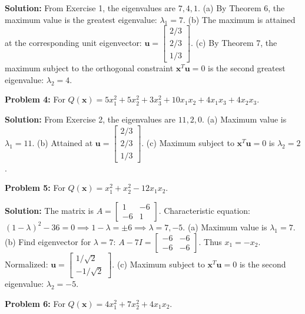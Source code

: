 \documentclass[11pt, letterpaper]{article}
\theoremstyle{definition}
\theoremstyle{remark}
\begin{document}
\textbf{Solution:}
From Exercise 1, the eigenvalues are $7, 4, 1$.
(a) By Theorem 6, the maximum value is the greatest eigenvalue: $\lambda_1 = 7$.
(b) The maximum is attained at the corresponding unit eigenvector: $\mathbf{u} = \begin{bmatrix} 2/3 \\ 2/3 \\ 1/3 \end{bmatrix}$.
(c) By Theorem 7, the maximum subject to the orthogonal constraint $\mathbf{x}^T\mathbf{u}=0$ is the second greatest eigenvalue: $\lambda_2 = 4$.

\vspace{1em}
\textbf{Problem 4:} For $Q(\mathbf{x}) = 5x_1^2 + 5x_2^2 + 3x_3^2 + 10x_1x_2 + 4x_1x_3 + 4x_2x_3$.

\textbf{Solution:}
From Exercise 2, the eigenvalues are $11, 2, 0$.
(a) Maximum value is $\lambda_1 = 11$.
(b) Attained at $\mathbf{u} = \begin{bmatrix} 2/3 \\ 2/3 \\ 1/3 \end{bmatrix}$.
(c) Maximum subject to $\mathbf{x}^T\mathbf{u}=0$ is $\lambda_2 = 2$.

\vspace{1em}
\textbf{Problem 5:} For $Q(\mathbf{x}) = x_1^2 + x_2^2 - 12x_1x_2$.

\textbf{Solution:}
The matrix is $A = \begin{bmatrix} 1 & -6 \\ -6 & 1 \end{bmatrix}$.
Characteristic equation: $(1-\lambda)^2 - 36 = 0 \implies 1-\lambda = \pm 6 \implies \lambda = 7, -5$.
(a) Maximum value is $\lambda_1 = 7$.
(b) Find eigenvector for $\lambda = 7$: $A - 7I = \begin{bmatrix} -6 & -6 \\ -6 & -6 \end{bmatrix}$. Thus $x_1 = -x_2$. Normalized: $\mathbf{u} = \begin{bmatrix} 1/\sqrt{2} \\ -1/\sqrt{2} \end{bmatrix}$.
(c) Maximum subject to $\mathbf{x}^T\mathbf{u}=0$ is the second eigenvalue: $\lambda_2 = -5$.

\vspace{1em}
\textbf{Problem 6:} For $Q(\mathbf{x}) = 4x_1^2 + 7x_2^2 + 4x_1x_2$.
\end{document}
